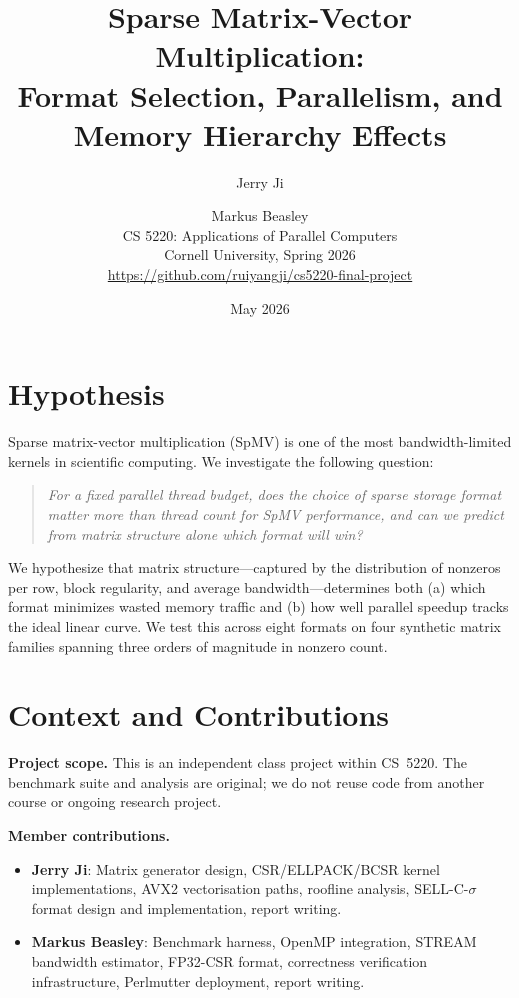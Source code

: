 \documentclass[11pt]{article}
\title{\textbf{Sparse Matrix-Vector Multiplication:\\
Format Selection, Parallelism, and Memory Hierarchy Effects}}
\author{
  Jerry Ji \and Markus Beasley \\[4pt]
  \small CS 5220: Applications of Parallel Computers \\
  \small Cornell University, Spring 2026 \\[4pt]
  \small \url{https://github.com/ruiyangji/cs5220-final-project}
}
\date{May 2026}
\begin{document}
\maketitle

\section{Hypothesis}

Sparse matrix-vector multiplication (SpMV) is one of the most
bandwidth-limited kernels in scientific computing. We investigate the
following question:

\begin{quote}
\emph{For a fixed parallel thread budget, does the choice of sparse
storage format matter more than thread count for SpMV performance, and
can we predict from matrix structure alone which format will win?}
\end{quote}

We hypothesize that matrix structure---captured by the distribution of
nonzeros per row, block regularity, and average bandwidth---determines
both (a) which format minimizes wasted memory traffic and (b) how well
parallel speedup tracks the ideal linear curve.  We test this across
eight formats on four synthetic matrix families spanning three orders of
magnitude in nonzero count.

\section{Context and Contributions}

\textbf{Project scope.}
This is an independent class project within CS~5220. The benchmark suite and
analysis are original; we do not reuse code from another course or ongoing
research project.

\textbf{Member contributions.}
\begin{itemize}
  \item \textbf{Jerry Ji}: Matrix generator design, CSR/ELLPACK/BCSR kernel
        implementations, AVX2 vectorisation paths, roofline analysis,
        SELL-C-$\sigma$ format design and implementation, report writing.
  \item \textbf{Markus Beasley}: Benchmark harness, OpenMP integration,
        STREAM bandwidth estimator, FP32-CSR format, correctness
        verification infrastructure, Perlmutter deployment, report writing.
\end{itemize}
\end{document}
